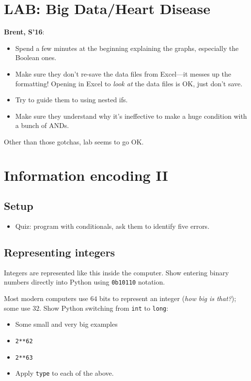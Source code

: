 \documentclass{article}
\newenvironment{reflect}[1]
{
  \begin{lrbox}{\reflectbox}
    \begin{minipage}[t]{\textwidth}
      \textbf{#1}:
}{
    \end{minipage}
  \end{lrbox}
  \fbox{\usebox{\reflectbox}}
}
\begin{document}
\section*{LAB: Big Data/Heart Disease}

\begin{reflect}{Brent, S'16}
  \begin{itemize}
  \item Spend a few minutes at the beginning explaining the graphs,
    especially the Boolean ones.
  \item Make sure they don't re-save the data files from Excel---it
    messes up the formatting!  Opening in Excel to \emph{look at} the
    data files is OK, just don't save.
  \item Try to guide them to using nested ifs.
  \item Make sure they understand why it's ineffective to make a huge
    condition with a bunch of ANDs.
  \end{itemize}

  Other than those gotchas, lab seems to go OK.
\end{reflect}

\section{Information encoding II}

\subsection*{Setup}
\begin{itemize}
\item Quiz: program with conditionals, ask them to identify five
  errors.
\end{itemize}

\subsection*{Representing integers}

Integers are represented like this inside the computer.  Show entering
binary numbers directly into Python using \verb|0b10110| notation.

Most modern computers use $64$ bits to represent an integer (\emph{how
  big is that?}); some use $32$. Show Python switching from \verb|int|
to \verb|long|:
\begin{itemize}
\item Some small and very big examples
\item \verb|2**62|
\item \verb|2**63|
\item Apply \verb|type| to each of the above.
\end{itemize}
\end{document}
